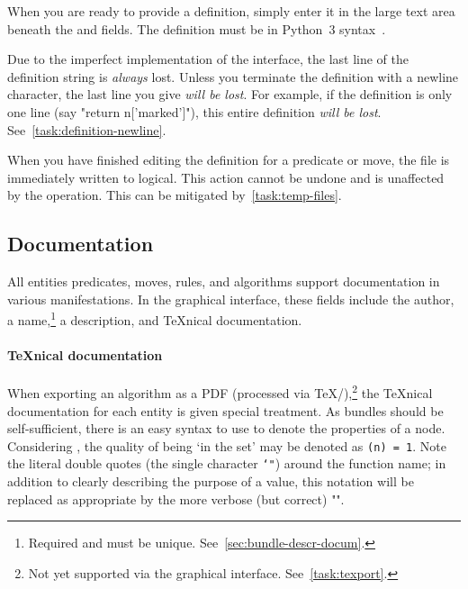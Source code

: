 When you are ready to provide a definition,
  simply enter it in the large text area beneath the
   and  fields.
The definition must be in Python~3 syntax~\autocite{python3:ref}.
\begin{warning}
  Due to the imperfect implementation of the interface,
    the last line of the definition string is \emph{always} lost.
  Unless you terminate the definition with a newline character,
    the last line you give \emph{will be lost}.
  For example, if the definition is only one line (say "return n['marked']"),
    this entire definition \emph{will be lost}.
  See~\autoref{task:definition-newline}.
\end{warning}

\begin{warning}
  When you have finished editing the definition for a predicate or move,
    the file is immediately written to logical.
  This action cannot be undone and is unaffected by the  operation.
  This can be mitigated by~\autoref{task:temp-files}.
\end{warning}

\subsection{Documentation}
All entities \Dash predicates, moves, rules, and algorithms \Dash support documentation in various manifestations.
In the graphical interface, these fields include the author,
  a name,\footnote{Required and must be unique.  See~\autoref{sec:bundle-descr-docum}.}
  a description, and \TeX nical documentation.
\paragraph{\TeX nical documentation}
When exporting an algorithm as a PDF (processed via \TeX\slash\TikZ),\footnote{%
  Not yet supported via the graphical interface.
  See~\autoref{task:texport}.}
  the \TeX nical documentation for each entity is given special treatment.
As bundles should be self-sufficient,
  there is an easy syntax to use to denote the properties of a node.
Considering , the quality of being \enquote*{in the set}
  may be denoted as \texttt{(n) = 1}.
Note the literal double quotes (the single character \texttt{\char`"}) around the function name;
  in addition to clearly describing the purpose of a value,
  this notation will be replaced as appropriate by
  the more verbose (but correct) "".

